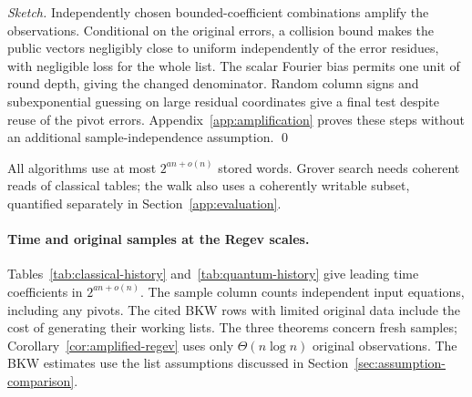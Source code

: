 \documentclass[runningheads,envcountsame,envcountsect,orivec]{llncs}
\begin{document}
\begin{proof}[Sketch]
Independently chosen bounded-coefficient combinations amplify the observations.
Conditional on the original errors, a collision bound makes the public
vectors negligibly close to uniform independently of the error residues,
with negligible loss for the whole list. The scalar Fourier bias permits one unit
of round depth, giving the changed denominator. Random column signs
and subexponential guessing on large residual coordinates give a
final test despite reuse of the pivot errors.
Appendix~\ref{app:amplification} proves these steps without an
additional sample-independence assumption.
\qed
\end{proof}

All algorithms use at most $2^{an+o(n)}$ stored words.
Grover search needs coherent reads of classical tables; the walk
also uses a coherently writable subset, quantified separately
in Section~\ref{app:evaluation}.

\paragraph{Time and original samples at the Regev scales.}
Tables~\ref{tab:classical-history} and~\ref{tab:quantum-history}
give leading time coefficients in $2^{an+o(n)}$. The sample
column counts independent input equations, including any pivots.
The cited BKW rows with limited original data include the cost
of generating their working lists. The three theorems concern fresh samples; Corollary~\ref{cor:amplified-regev}
uses only $\Theta(n\log n)$ original observations. The BKW estimates use the list assumptions
discussed in Section~\ref{sec:assumption-comparison}.
\end{document}
